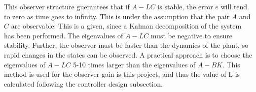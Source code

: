 This observer structure guerantees that if $A-LC$ is stable, the error $e$ will tend to zero as time goes to infinity. This is under the assumption that the pair $A$ and $C$ are observable. This is a given, since a Kalman decomposition of the system has been performed. The eigenvalues of $A-LC$ must be negative to ensure stability. Further, the observer must be faster than the dynamics of the plant, so rapid changes in the states can be observed. A practical approach is to choose the eigenvalues of $A-LC$ 5-10 times larger than the eigenvalues of $A-BK$. This method is used for the observer gain is this project, and thus the value of L is calculated following the controller design subsection.
